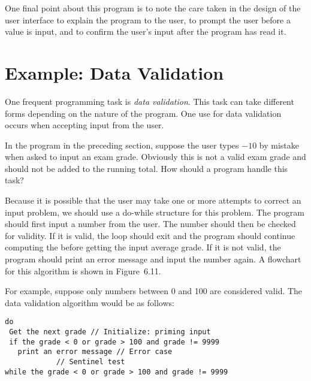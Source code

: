 One final point about this program is to note the care taken in the
design of the user interface to explain the program to the user, to
prompt the user before a value is input, and to confirm the user's
input after the program has read it.


\section{Example: Data Validation}
\noindent One frequent programming task is {\it data validation}. This
task can take different forms depending on the nature of the
program. One use for data validation occurs when accepting input from
the user.

In the program in the preceding section, suppose the user types $-10$
by mistake when asked to input an exam grade. Obviously this is not a
valid exam grade and should not be added to the running total. How
should a program handle this task?

Because it is possible that the user may take one or more attempts
to correct an input problem, we should use a do-while structure for
this problem.  The program should first input a number from the
user. The number should then be checked for validity. If it is valid,
the loop should exit and the program should continue computing the
before getting the input average grade. If it is not valid, the
program should print an error message and input the number again. A
flowchart for this algorithm is shown in Figure~6.11.

For example, suppose only numbers between 0 and 100 are considered
valid. The data validation algorithm would be as follows:

\begin{jjjlisting}
\begin{lstlisting}
do
 Get the next grade // Initialize: priming input
 if the grade < 0 or grade > 100 and grade != 9999
   print an error message // Error case
            // Sentinel test
while the grade < 0 or grade > 100 and grade != 9999 
\end{lstlisting}
\end{jjjlisting}


